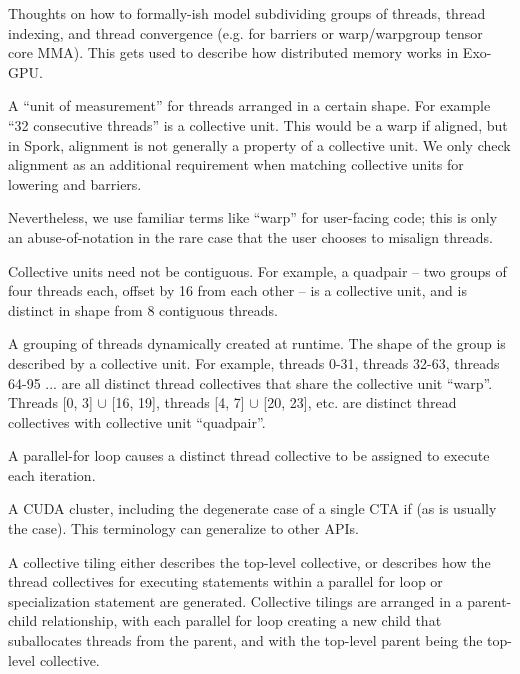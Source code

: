 
Thoughts on how to formally-ish model subdividing groups of threads, thread indexing, and thread convergence (e.g. for barriers or warp/warpgroup tensor core MMA).
This gets used to describe how distributed memory works in Exo-GPU.

\filbreak
{} A ``unit of measurement'' for threads arranged in a certain shape.
For example ``32 consecutive threads'' is a collective unit.
This would be a warp if aligned, but in Spork, alignment is not generally a property of a collective unit.
We only check alignment as an additional requirement when matching collective units for lowering  and barriers.

\filbreak
Nevertheless, we use familiar terms like ``warp'' for user-facing code; this is only an abuse-of-notation in the rare case that the user chooses to misalign threads.

\filbreak
Collective units need not be contiguous.
For example, a quadpair -- two groups of four threads each, offset by 16 from each other -- is a collective unit, and is distinct in shape from 8 contiguous threads.

\filbreak
{} A grouping of threads dynamically created at runtime.
The shape of the group is described by a collective unit.
For example, threads 0-31, threads 32-63, threads 64-95 ... are all distinct thread collectives that share the collective unit ``warp''.
Threads [0, 3] $\cup$ [16, 19], threads [4, 7] $\cup$ [20, 23], etc. are distinct thread collectives with collective unit ``quadpair''.

\filbreak
A parallel-for loop causes a distinct thread collective to be assigned to execute each iteration.

\filbreak
{} A CUDA cluster, including the degenerate case of a single CTA if  (as is usually the case).
This terminology can generalize to other APIs.

\filbreak
{} A collective tiling either describes the top-level collective, or describes how the thread collectives for executing statements within a parallel for loop or specialization statement are generated.
Collective tilings are arranged in a parent-child relationship, with each parallel for loop creating a new child that suballocates threads from the parent, and with the top-level parent being the top-level collective.

